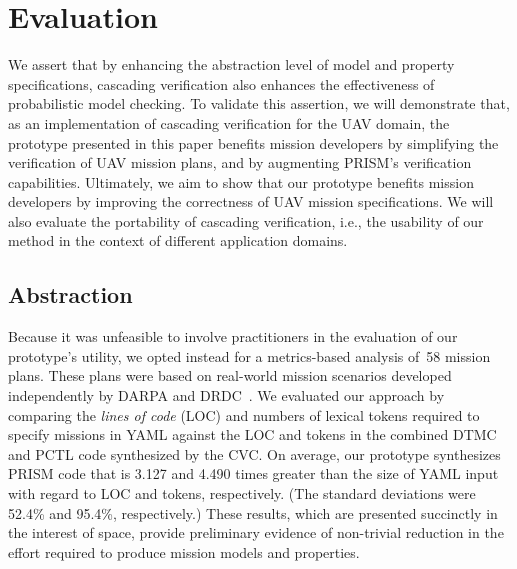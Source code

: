 \section{Evaluation}
\label{sec:Evaluation}

\noindent We assert that by enhancing the abstraction level of model and property specifications, cascading verification also enhances the effectiveness of probabilistic model checking. To validate this assertion, we will demonstrate that, as an implementation of cascading verification for the UAV domain, the prototype presented in this paper benefits mission developers by simplifying the verification of UAV mission plans, and by augmenting PRISM's verification capabilities. Ultimately, we aim to show that our prototype benefits mission developers by improving the correctness of UAV mission specifications. We will also evaluate the portability of cascading verification, i.e., the usability of our method in the context of different application domains.

\subsection{Abstraction}

\noindent Because it was unfeasible to involve practitioners in the evaluation of our prototype's utility, we opted instead for a metrics-based analysis of~58 mission plans. These plans were based on real-world mission scenarios developed independently by DARPA and DRDC~\cite{DARPA,Youngson_2004}. We evaluated our approach by comparing the \emph{lines of code} (LOC) and numbers of lexical tokens required to specify missions in YAML against the LOC and tokens in the combined DTMC and PCTL code synthesized by the CVC\@. On average, our prototype synthesizes PRISM code that is 3.127 and 4.490 times greater than the size of YAML input with regard to LOC and tokens, respectively. (The standard deviations were 52.4\% and 95.4\%, respectively.) These results, which are presented succinctly in the interest of space, provide preliminary evidence of non-trivial reduction in the effort required to produce mission models and properties.

